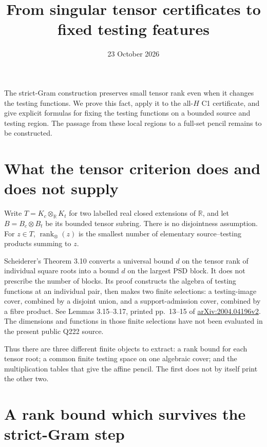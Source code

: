 \documentclass[11pt]{article}
\title{From singular tensor certificates to fixed testing features}
\author{}
\date{23 October 2026}
\newcommand{\R}{\mathbb R}
\newcommand{\rankt}{\operatorname{rank}_{\otimes}}
\begin{document}
\maketitle

\noindent
The strict-Gram construction preserves small tensor rank even when
it changes the testing functions. We prove this fact, apply it to
the all-$H$ C1 certificate, and give explicit formulas for fixing
the testing functions on a bounded source and testing region.
The passage from these local regions to a full-set pencil remains
to be constructed.

\section{What the tensor criterion does and does not supply}

Write $T=K_c\otimes_{\R}K_t$ for two labelled real closed
extensions of $\R$, and let $B=B_c\otimes B_t$ be its bounded
tensor subring. There is no disjointness assumption.
For $z\in T$, $\rankt(z)$ is the smallest number of elementary
source--testing products summing to $z$.

Scheiderer's Theorem 3.10 converts a universal bound $d$ on the
tensor rank of individual square roots into a bound $d$ on the
largest PSD block. It does not prescribe the number of blocks.
Its proof constructs the algebra of testing functions at an
individual pair, then makes two finite selections: a testing-image
cover, combined by a disjoint union, and a support-admission cover,
combined by a fibre product. See Lemmas 3.15--3.17, printed
pp.~13--15 of
\href{https://arxiv.org/pdf/2004.04196}{arXiv:2004.04196v2}.
The dimensions and functions in those finite selections have not
been evaluated in the present public Q222 source.

Thus there are three different finite objects to extract:
a rank bound for each tensor root; a common finite testing space
on one algebraic cover; and the multiplication tables that give
the affine pencil. The first does not by itself print the other two.

\section{A rank bound which survives the strict-Gram step}
\end{document}
